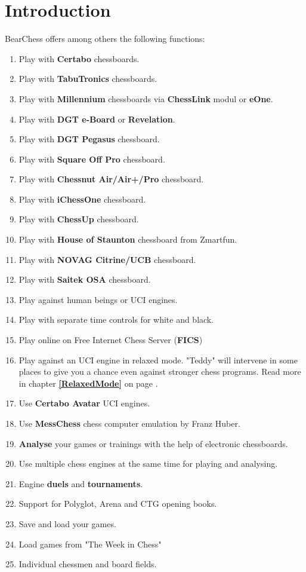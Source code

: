 \documentclass[11pt,a4paper]{article}
\begin{document}
	\section{Introduction}
	BearChess offers among others the following functions:
	\begin{enumerate}
		\item Play with \textbf{Certabo} chessboards.
		\item Play with \textbf{TabuTronics} chessboards.	  
		\item Play with \textbf{Millennium} chessboards via \textbf{ChessLink} modul or \textbf{eOne}.
		\item Play with \textbf{DGT e-Board} or \textbf{Revelation}.	  
		\item Play with \textbf{DGT Pegasus} chessboard.	  
		\item Play with \textbf{Square Off Pro} chessboard.	  	  
		\item Play with \textbf{Chessnut Air/Air+/Pro} chessboard.	  	  	  
		\item Play with \textbf{iChessOne} chessboard.	  	  	  	  
		\item Play with \textbf{ChessUp} chessboard.	  	  	  	  	  
        \item Play with \textbf{House of Staunton} chessboard from Zmartfun.
		\item Play with \textbf{NOVAG Citrine/UCB} chessboard.
		\item Play with \textbf{Saitek OSA} chessboard.	  
		\item Play against human beings or UCI engines.
		\item Play with separate time controls for white and black.
		\item Play online on Free Internet Chess Server (\textbf{FICS})
		\item Play against an UCI engine in relaxed mode. "Teddy" will intervene in some places to give you a chance even against stronger chess programs. Read more in chapter \textbf{\ref{RelaxedMode}  } on page \pageref{RelaxedMode}.  	  
		\item Use \textbf{Certabo Avatar} UCI engines.  	  
		\item Use \textbf{MessChess} chess computer emulation by Franz Huber.  	    	  
		\item \textbf{Analyse} your games or trainings with the help of electronic chessboards.
		\item Use multiple chess engines at the same time for playing and analysing.
		\item Engine \textbf{duels} and \textbf{tournaments}.
		\item Support for Polyglot, Arena and CTG opening books.
		\item Save and load your games.
		\item Load games from "The Week in Chess"
		\item Individual chessmen and board fields.
	\end{enumerate}
	
\end{document}
